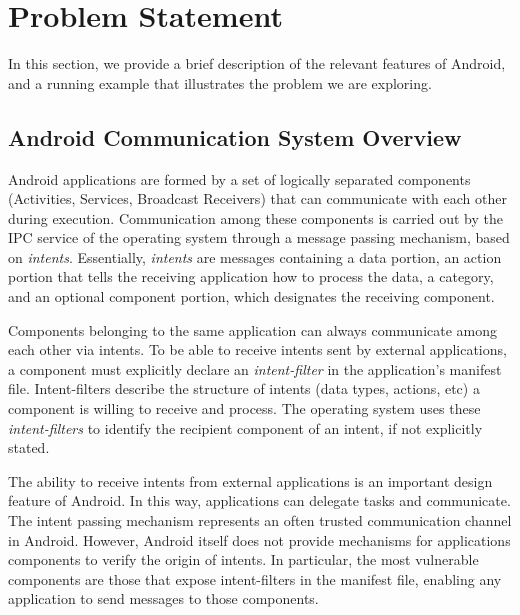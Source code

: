 \section{Problem Statement}
\label{sec:problem}


In this section, we provide a brief description of the relevant features of Android, and a running example that illustrates the problem we are exploring.

\subsection{Android Communication System Overview}

Android applications are formed by a set of logically separated components
(Activities, Services, Broadcast Receivers) that can communicate with each other
during execution. Communication among these components is carried out by the IPC
service of the operating system through a message passing mechanism, based on
\emph{intents}. Essentially, \emph{intents} are messages containing a data portion, an action portion
that tells the receiving application how to process the data, a category, and an optional
component portion, which designates the receiving component.

Components belonging to the same application can always communicate among each other via intents.
To be able to receive intents sent by external applications, a component must
explicitly declare an \emph{intent-filter} in the application's manifest file.
Intent-filters describe the structure of intents (data types, actions, etc) a component is
willing to receive and process. The operating system uses these \emph{intent-filters} to
identify the recipient component of an intent, if not explicitly stated.

The ability to receive intents from external applications is an important design feature of Android.
In this way, applications can delegate tasks and communicate.
The intent passing mechanism represents an often trusted communication channel
in Android. However, Android itself does not provide mechanisms for applications
components to verify the origin of intents. In particular, the most vulnerable
components are those that expose intent-filters in the manifest file, enabling any application
to send messages to those components. 

